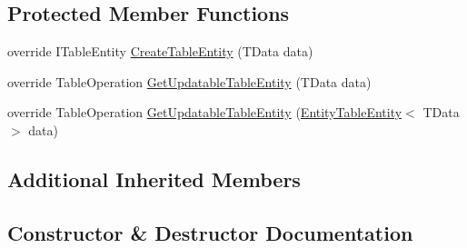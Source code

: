 \subsection*{Protected Member Functions}
\begin{DoxyCompactItemize}
\item 
override I\+Table\+Entity \hyperlink{classCqrs_1_1Azure_1_1BlobStorage_1_1DataStores_1_1TableStorageDataStore_ac28ce10858480acc61d3a3df4fb3dae4_ac28ce10858480acc61d3a3df4fb3dae4}{Create\+Table\+Entity} (T\+Data data)
\item 
override Table\+Operation \hyperlink{classCqrs_1_1Azure_1_1BlobStorage_1_1DataStores_1_1TableStorageDataStore_aa4dc1bfeeb55483b68d8af3414000f7a_aa4dc1bfeeb55483b68d8af3414000f7a}{Get\+Updatable\+Table\+Entity} (T\+Data data)
\item 
override Table\+Operation \hyperlink{classCqrs_1_1Azure_1_1BlobStorage_1_1DataStores_1_1TableStorageDataStore_a2a6af1eed637f7ac828078a883881fd3_a2a6af1eed637f7ac828078a883881fd3}{Get\+Updatable\+Table\+Entity} (\hyperlink{classCqrs_1_1Azure_1_1BlobStorage_1_1EntityTableEntity}{Entity\+Table\+Entity}$<$ T\+Data $>$ data)
\end{DoxyCompactItemize}
\subsection*{Additional Inherited Members}


\subsection{Constructor \& Destructor Documentation}
\mbox{\label{classCqrs_1_1Azure_1_1BlobStorage_1_1DataStores_1_1TableStorageDataStore_a29c0fb07b5b5e6655a24cc831484646a_a29c0fb07b5b5e6655a24cc831484646a}} 
